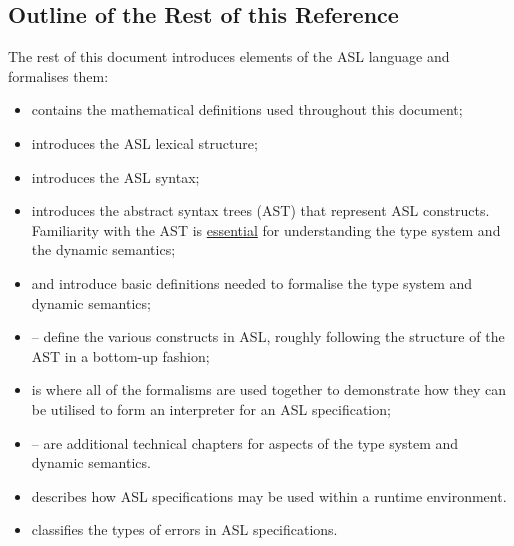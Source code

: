 \subsection{Outline of the Rest of this Reference}
The rest of this document introduces elements of the ASL language
and formalises them:
\begin{itemize}
    \item {} contains the mathematical definitions used
        throughout this document;
    \item {} introduces the ASL lexical structure;
    \item {} introduces the ASL syntax;
    \item {} introduces the abstract syntax trees (AST)
        that represent ASL constructs.
        Familiarity with the AST is \underline{essential} for understanding the
        type system and the dynamic semantics;
    \item {} and  introduce basic
        definitions needed to formalise the type system and dynamic semantics;
    \item {}--
        define the various constructs in ASL, roughly following the structure of the AST
        in a bottom-up fashion;
    \item {} is where all of the formalisms are used together to
        demonstrate how they can be utilised to form an interpreter for an ASL specification;
    \item {}-- are additional
        technical chapters for aspects of the type system and dynamic semantics.
    \item {} describes how ASL specifications may be used
        within a runtime environment.
    \item {} classifies the types of errors in ASL specifications.
\end{itemize}
